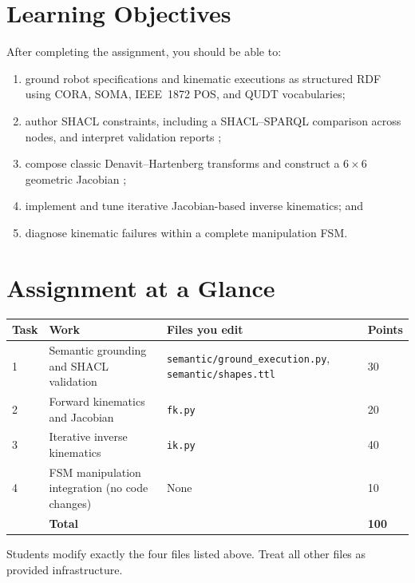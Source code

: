 \documentclass[11pt]{article}
\newcommand{\code}[1]{\nolinkurl{#1}}
\begin{document}
\section{Learning Objectives}

After completing the assignment, you should be able to:
\begin{enumerate}
  \item ground robot specifications and kinematic executions as structured RDF
    using CORA, SOMA, IEEE~1872 POS, and QUDT vocabularies;
  \item author SHACL constraints, including a SHACL--SPARQL comparison across
    nodes, and interpret validation reports \cite{w3cshacl};
  \item compose classic Denavit--Hartenberg transforms and construct a
    $6\times6$ geometric Jacobian \cite{craig2005robotics};
  \item implement and tune iterative Jacobian-based inverse kinematics; and
  \item diagnose kinematic failures within a complete manipulation FSM.
\end{enumerate}

\clearpage
\section{Assignment at a Glance}

\begin{table}[htbp]
\centering
\small
\renewcommand{\arraystretch}{1.2}
\begin{tabular}{L{.06\linewidth}L{.29\linewidth}L{.43\linewidth}L{.08\linewidth}}
\toprule
\textbf{Task} & \textbf{Work} & \textbf{Files you edit} & \textbf{Points}\\
 & Semantic grounding and SHACL validation &
\code{semantic/ground_execution.py}, \code{semantic/shapes.ttl} & 30\\
2 & Forward kinematics and Jacobian & \code{fk.py} & 20\\
3 & Iterative inverse kinematics & \code{ik.py} & 40\\
4 & FSM manipulation integration (no code changes) & None & 10\\
\midrule
& \textbf{Total} && \textbf{100}\\
\bottomrule
\end{tabular}
\end{table}

Students modify exactly the four files listed above. Treat all other files as
provided infrastructure.
\end{document}
